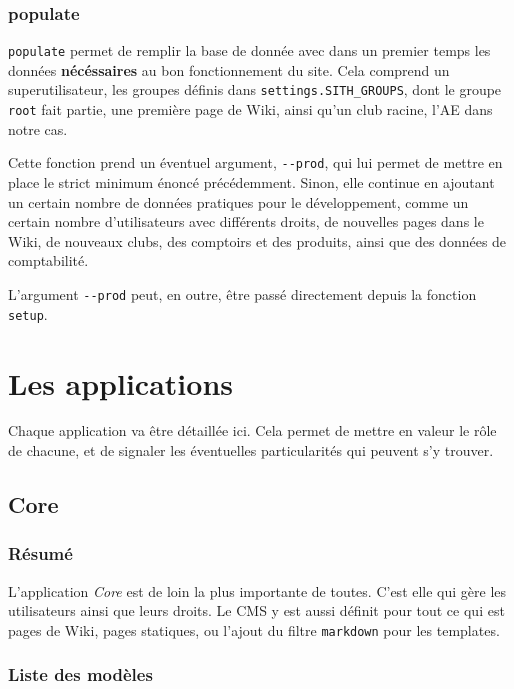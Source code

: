 \documentclass[a4paper]{report}
\begin{document}
\subsection{populate}
\label{sub:populate}
\par \verb#populate# permet de remplir la base de donnée avec dans un premier temps les données \textbf{nécéssaires} au
bon fonctionnement du site. Cela comprend un superutilisateur, les groupes définis dans \verb#settings.SITH_GROUPS#,
dont le groupe \verb#root# fait partie, une première page de Wiki, ainsi qu'un club racine, l'AE dans notre cas.
\par Cette fonction prend un éventuel argument, \verb#--prod#, qui lui permet de mettre en place le strict minimum
énoncé précédemment. Sinon, elle continue en ajoutant un certain nombre de données pratiques pour le développement,
comme un certain nombre d'utilisateurs avec différents droits, de nouvelles pages dans le Wiki, de nouveaux clubs, des
comptoirs et des produits, ainsi que des données de comptabilité.
\par L'argument \verb#--prod# peut, en outre, être passé directement depuis la fonction \verb#setup#.

\chapter{Les applications}
\label{cha:les_applications}
\par Chaque application va être détaillée ici. Cela permet de mettre en valeur le rôle de chacune, et de signaler les
éventuelles particularités qui peuvent s'y trouver.

\section{Core}
\label{sec:core}
\subsection{Résumé}
\label{sub:r_sum_}
\par L'application \emph{Core} est de loin la plus importante de toutes. C'est elle qui gère les utilisateurs ainsi que
leurs droits. Le CMS y est aussi définit pour tout ce qui est pages de Wiki, pages statiques, ou l'ajout du filtre
\verb#markdown# pour les templates.
\subsection{Liste des modèles}
\label{sub:liste_des_mod_les}
\end{document}
